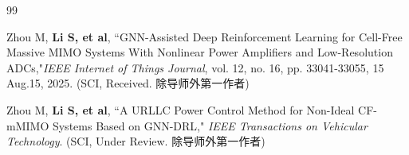 \begin{publications}{99}


\item{Zhou M, \bf{Li S}, et al}, {``GNN-Assisted Deep Reinforcement Learning for Cell-Free Massive MIMO Systems With Nonlinear Power Amplifiers and Low-Resolution ADCs,"}\emph{IEEE Internet of Things Journal}, vol. 12, no. 16, pp. 33041-33055, 15 Aug.15, 2025. (SCI, Received. 除导师外第一作者)
\item{Zhou M, \bf{Li S}, et al}, {``A URLLC Power Control Method for Non-Ideal CF-mMIMO Systems Based on GNN-DRL,"} \emph{IEEE Transactions on Vehicular Technology}. (SCI, Under Review. 除导师外第一作者)
\end{publications}
